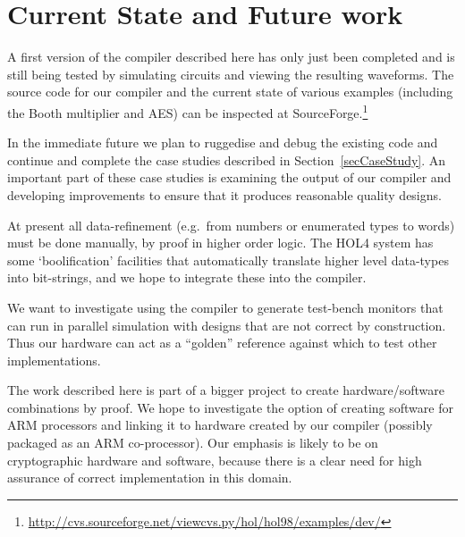 \documentclass{llncs}
\begin{document}
\section{Current State and Future work}
\label{secFutureWork}


A first version of the compiler described here has only just been
completed and is still being tested by simulating circuits and
viewing the resulting waveforms. The source code for our compiler and
the current state of various examples (including the Booth multiplier
and AES) can be inspected at
SourceForge.\footnote{\url{http://cvs.sourceforge.net/viewcvs.py/hol/hol98/examples/dev/}}


In the immediate future we plan to ruggedise and debug the existing
code and continue and complete the case studies described in
Section~\ref{secCaseStudy}. An important part of these case studies is
examining the output of our compiler and developing improvements to
ensure that it produces reasonable quality designs.

At present all data-refinement (e.g.~from numbers or enumerated types
to words) must be done manually, by proof in higher order logic. The
HOL4 system has some `boolification' facilities that automatically
translate higher level data-types into bit-strings, and we hope to
integrate these into the compiler.

We want to investigate using the compiler to generate test-bench
monitors that can run in parallel simulation with designs that are not
correct by construction.  Thus our hardware can act as a ``golden''
reference against which to test other implementations.

The work described here is part of a bigger project to create
hardware/software combinations by proof.  We hope to investigate the
option of creating software for ARM processors and linking it to
    hardware created by our compiler (possibly packaged as an ARM
co-processor). Our emphasis is likely to be on cryptographic hardware
and software, because there is a clear need for high assurance of
correct implementation in this domain.






\end{document}
